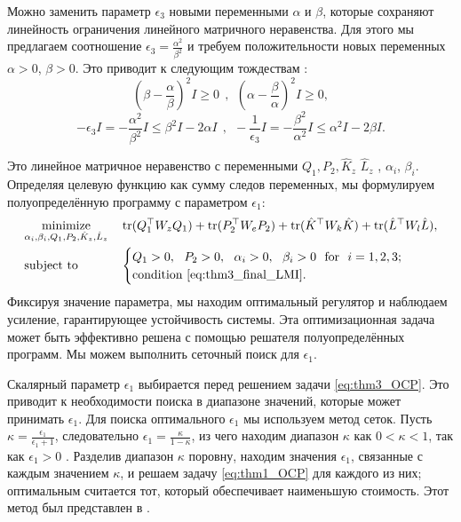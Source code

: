\begin{remark}
	\label{rmk:alpha_beta}
	Можно заменить параметр $\epsilon_3$ новыми переменными $\alpha$ и $\beta$, которые сохраняют линейность ограничения линейного матричного неравенства. Для этого мы предлагаем соотношение $\epsilon_3=\frac{\alpha^2}{\beta^2}$ и требуем положительности новых переменных $\alpha>0$, $\beta>0$. Это приводит к следующим тождествам \cite{KHELOUFI2016}:
	\begin{equation}
		\label{eq:apha_beta_rm_eq1}
		\left(\beta-\frac{\alpha}{\beta}\right)^2 {I} \geq 0 \ \ , \ \  \left(\alpha-\frac{\beta}{\alpha}\right)^2 {I} \geq 0,
	\end{equation}
	\begin{equation}
		\label{eq:apha_beta_rm_eq2}
		-\epsilon_3 {I} = -\frac{\alpha^2}{\beta^2}{I} \leq \beta^2{I}-2\alpha {I} \ \ , \ \  -\frac{1}{\epsilon_3} {I} = -\frac{\beta^2}{\alpha^2}{I} \leq \alpha^2{I}-2\beta {I} .
	\end{equation}
\end{remark}
Это линейное матричное неравенство с переменными ${Q}_1,{P}_2,\hat{{K}}_z$ $\hat{{L}}_z$ , $\alpha_i$, $\beta_i$. Определяя целевую функцию как сумму следов переменных, мы формулируем полуопределённую программу с параметром $\epsilon_1$:
%
\begin{equation}
	\label{eq:thm3_OCP}
	\begin{aligned}
		& \underset{\alpha_i, \beta_i, {Q}_1, {P}_2, \hat{{K}}_z, \hat{{L}}_z}{\text{minimize}}
		& & \operatorname{tr}({Q}_1^\top{W}_z{Q}_1)+ \operatorname{tr}({P}_2^\top{W}_e{P}_2)+ \operatorname{tr}(\hat{{K}}^\top{W}_k\hat{{K}})+\operatorname{tr}(\hat{{L}}^\top{W}_l\hat{{L}}), \\
		& \text{subject to}
		& & \begin{cases}
			{Q}_1 > 0, \ \
			{P}_2 > 0, \ \
			\alpha_i >0, \ \
			\beta_i>0 \ \
			\text{for} \ \ i=1,2,3;\\
			\text{condition \eqref{eq:thm3_final_LMI}}.
		\end{cases}
	\end{aligned}
\end{equation}
%
Фиксируя значение параметра, мы находим оптимальный регулятор и наблюдаем усиление, гарантирующее устойчивость системы. Эта оптимизационная задача может быть эффективно решена с помощью решателя полуопределённых программ. Мы можем выполнить сеточный поиск для $\epsilon_1$.
 \begin{remark}
	\label{rm:griding_search}
	Скалярный параметр $\epsilon_1$ выбирается перед решением задачи \eqref{eq:thm3_OCP}. Это приводит к необходимости поиска в диапазоне значений, которые может принимать $\epsilon_1$. Для поиска оптимального $\epsilon_1$ мы используем метод сеток. Пусть $\kappa=\frac{\epsilon_1}{\epsilon_1+1}$, следовательно
	$\epsilon_1=\frac{\kappa}{1-\kappa}$, из чего находим диапазон $\kappa$ как $0 < \kappa < 1$, так как $\epsilon_1 > 0$ \cite{Li1997}. Разделив диапазон $\kappa$ поровну, находим значения $\epsilon_1$, связанные с каждым значением $\kappa$, и решаем задачу \eqref{eq:thm1_OCP} для каждого из них; оптимальным считается тот, который обеспечивает наименьшую стоимость. Этот метод был представлен в \cite{Li1997}.
\end{remark}
